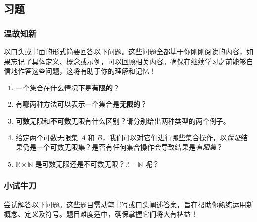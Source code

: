 
\subsection{习题}\label{sec:section7.6.5}

\subsubsection*{温故知新}

以口头或书面的形式简要回答以下问题。这些问题全都基于你刚刚阅读的内容，如果忘记了具体定义、概念或示例，可以回顾相关内容。确保在继续学习之前能够自信地作答这些问题，这将有助于你的理解和记忆！

\begin{enumerate}[label=(\arabic*)]
    \item 一个集合在什么情况下是\textbf{有限的}？
    \item 有哪两种方法可以表示一个集合是\textbf{无限的}？
    \item \textbf{可数}无限和\textbf{不可数}无限有什么区别？请分别给出两种类型的两个例子。
    \item 给定两个可数无限集 $A$ 和 $B$，我们可以对它们进行哪些集合操作，以\emph{保证}结果仍是一个可数无限集？是否有任何集合操作会导致结果是\emph{有限集}？
    \item $\mathbb{R} \times \mathbb{N}$ 是可数无限还是不可数无限？$\mathbb{R} - \mathbb{N}$ 呢？
\end{enumerate}

\subsubsection*{小试牛刀}

尝试解答以下问题。这些题目需动笔书写或口头阐述答案，旨在帮助你熟练运用新概念、定义及符号。题目难度适中，确保掌握它们将大有裨益！

